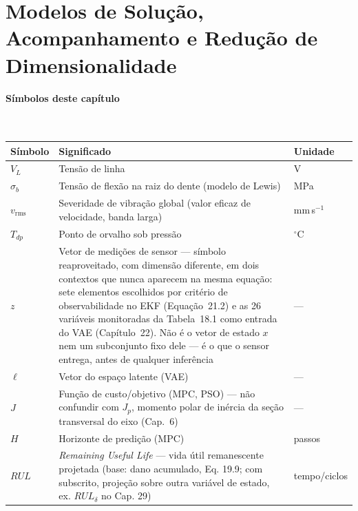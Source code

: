 \documentclass[12pt,a4paper]{article}
\numberwithin{equation}{section}
\numberwithin{table}{section}
\numberwithin{figure}{section}
\begin{document}
\clearpage
\section{Modelos de Solução, Acompanhamento e Redução de Dimensionalidade}

\paragraph{Símbolos deste capítulo}\mbox{}\\[-0.5em]
{\small
\begin{longtable}{>{\raggedright\arraybackslash}p{2.6cm} >{\raggedright\arraybackslash}p{9.2cm} >{\raggedright\arraybackslash}p{2.6cm}}
	\toprule
	\textbf{Símbolo} & \textbf{Significado} & \textbf{Unidade} \\ \midrule
	\endhead
	$V_L$ & Tensão de linha & V \\
	$\sigma_b$ & Tensão de flexão na raiz do dente (modelo de Lewis) & MPa \\
	$v_{\text{rms}}$ & Severidade de vibração global (valor eficaz de velocidade, banda larga) & mm\,s$^{-1}$ \\
	$T_{dp}$ & Ponto de orvalho sob pressão & $^{\circ}$C \\
	$z$ & Vetor de medições de sensor — símbolo reaproveitado, com dimensão diferente, em dois contextos que nunca aparecem na mesma equação: sete elementos escolhidos por critério de observabilidade no EKF (Equação~21.2) e as 26 variáveis monitoradas da Tabela~18.1 como entrada do VAE (Capítulo~22). Não é o vetor de estado $x$ nem um subconjunto fixo dele — é o que o sensor entrega, antes de qualquer inferência & --- \\
	$\ell$\dag & Vetor do espaço latente (VAE) & --- \\
	$J$ & Função de custo/objetivo (MPC, PSO) — não confundir com $J_p$, momento polar de inércia da seção transversal do eixo (Cap.~6) & --- \\
	$H$ & Horizonte de predição (MPC) & passos \\
	$RUL$ & \textit{Remaining Useful Life} — vida útil remanescente projetada (base: dano acumulado, Eq. 19.9; com subscrito, projeção sobre outra variável de estado, ex. $RUL_\delta$ no Cap. 29) & tempo/ciclos \\
	\bottomrule
\end{longtable}
}
\end{document}
